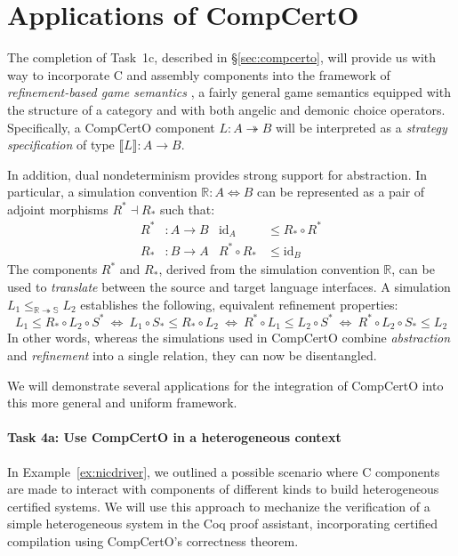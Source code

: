 \section{Applications of CompCertO}
\label{sec:compcertox}

The completion of Task~1c, described in \S\ref{sec:compcerto},
will provide us with way to incorporate C and assembly components
into the framework of \emph{refinement-based game semantics} \cite{rbgs-cal},
a fairly general game semantics
equipped with the structure of a category
and with both angelic and demonic choice operators.
Specifically,
a CompCertO component $L : A \twoheadrightarrow B$
will be interpreted as a \emph{strategy specification} of type
$\llbracket L \rrbracket : A \rightarrow B$.

In addition, dual nondeterminism provides strong support for abstraction.
In particular,
a simulation convention $\mathbb{R} : A \Leftrightarrow B$
can be represented as a pair of adjoint morphisms $R^* \dashv R_*$ such that:
\begin{align*}
  R^* &: A \rightarrow B &
  \mathrm{id}_A &\le R_* \circ R^* \\
  R_* &: B \rightarrow A &
  R^* \circ R_* &\le \mathrm{id}_B
\end{align*}
The components $R^*$ and $R_*$,
derived from the simulation convention $\mathbb{R}$,
can be used
to \emph{translate} between the source and target language interfaces.
A simulation $L_1 \le_{\mathbb{R} \twoheadrightarrow \mathbb{S}} L_2$
establishes the following, equivalent refinement properties:
\[
  L_1 \le R_* \circ L_2 \circ S^* \: \Leftrightarrow \:
  L_1 \circ S_* \le R_* \circ L_2 \: \Leftrightarrow \:
  R^* \circ L_1 \le L_2 \circ S^* \: \Leftrightarrow \:
  R^* \circ L_2 \circ S_* \le L_2
\]
In other words,
whereas the simulations used in CompCertO
combine \emph{abstraction} and \emph{refinement}
into a single relation,
they can now be disentangled.

We will demonstrate several applications for
the integration of CompCertO into this more general and uniform framework.

\paragraph*{Task 4a: Use CompCertO in a heterogeneous context}

In Example~\ref{ex:nicdriver},
we outlined a possible scenario where C components
are made to interact with components of different kinds
to build heterogeneous certified systems.
We will use this approach to
mechanize the verification of a simple heterogeneous system
in the Coq proof assistant,
incorporating certified compilation using CompCertO's correctness theorem.

